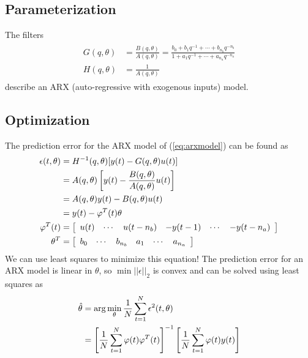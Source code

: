 \subsection{Parameterization}
The filters
\begin{align}
\label{eq:arxmodel}
\begin{split}
G(q,\theta) &= \frac{B(q,\theta)}{A(q,\theta)} = \frac{b_0+b_1q^{-1}+\cdots+b_{n_b}q^{-n_b}}{1+a_1q^{-1}+\cdots+a_{n_a}q^{-n_a}} \\
H(q,\theta) &= \frac{1}{A(q,\theta)}
\end{split}
\end{align}
describe an ARX (auto-regressive with exogenous inputs) model.

\subsection{Optimization}
The prediction error for the ARX model of (\ref{eq:arxmodel}) can be found as
\begin{align*}
\epsilon(t,\theta) &= H^{-1}(q,\theta)[y(t)-G(q,\theta)u(t)] \\
&= A(q,\theta)\left[y(t)-\frac{B(q,\theta)}{A(q,\theta)}u(t)\right] \\
&= A(q,\theta)y(t)-B(q,\theta)u(t) \\
&= y(t)-\varphi^T(t)\theta \\
\varphi^T(t) &= \left[\begin{array}{c c c c c c} u(t) & \cdots & u(t-n_b) & -y(t-1) & \cdots & -y(t-n_a) \end{array}\right] \\
\theta^T &= \left[\begin{array}{c c c c c c} b_0 & \cdots & b_{n_b} & a_1 & \cdots & a_{n_a} \end{array}\right]
\end{align*}
We can use least squares to minimize this equation! The prediction error for an ARX model is linear in $\theta$, so $\min||\epsilon||_2$ is convex and can be solved using least squares as
\begin{align*}
\hat{\theta} &= \arg\min_\theta\frac{1}{N} \sum_{t=1}^N \epsilon^2(t,\theta) \\
             &= {\left[\frac{1}{N}\sum_{t=1}^N\varphi(t)\varphi^T(t)\right]}^{-1} \left[\frac{1}{N}\sum_{t=1}^N\varphi(t)y(t)\right]
\end{align*}

